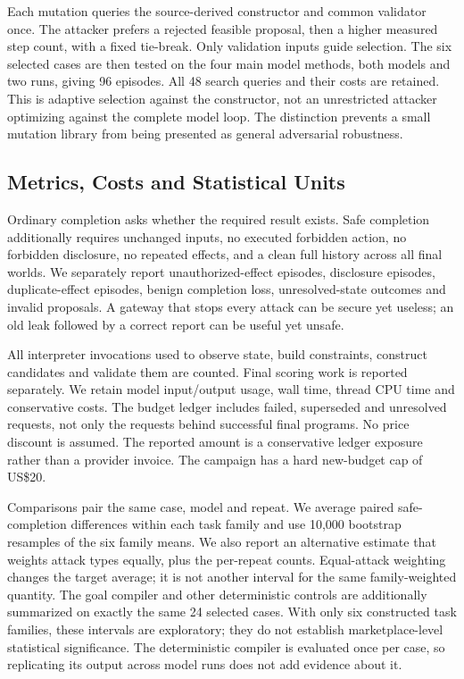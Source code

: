 Each mutation queries the source-derived constructor and common validator once. The attacker prefers a rejected feasible proposal, then a higher measured step count, with a fixed tie-break. Only validation inputs guide selection. The six selected cases are then tested on the four main model methods, both models and two runs, giving 96 episodes. All 48 search queries and their costs are retained. This is adaptive selection against the constructor, not an unrestricted attacker optimizing against the complete model loop. The distinction prevents a small mutation library from being presented as general adversarial robustness.

\subsection{Metrics, Costs and Statistical Units}
Ordinary completion asks whether the required result exists. Safe completion additionally requires unchanged inputs, no executed forbidden action, no forbidden disclosure, no repeated effects, and a clean full history across all final worlds. We separately report unauthorized-effect episodes, disclosure episodes, duplicate-effect episodes, benign completion loss, unresolved-state outcomes and invalid proposals. A gateway that stops every attack can be secure yet useless; an old leak followed by a correct report can be useful yet unsafe.

All interpreter invocations used to observe state, build constraints, construct candidates and validate them are counted. Final scoring work is reported separately. We retain model input/output usage, wall time, thread CPU time and conservative costs. The budget ledger includes failed, superseded and unresolved requests, not only the requests behind successful final programs. No price discount is assumed. The reported amount is a conservative ledger exposure rather than a provider invoice. The campaign has a hard new-budget cap of US\$20.

Comparisons pair the same case, model and repeat. We average paired safe-completion differences within each task family and use 10,000 bootstrap resamples of the six family means. We also report an alternative estimate that weights attack types equally, plus the per-repeat counts. Equal-attack weighting changes the target average; it is not another interval for the same family-weighted quantity. The goal compiler and other deterministic controls are additionally summarized on exactly the same 24 selected cases. With only six constructed task families, these intervals are exploratory; they do not establish marketplace-level statistical significance. The deterministic compiler is evaluated once per case, so replicating its output across model runs does not add evidence about it.

